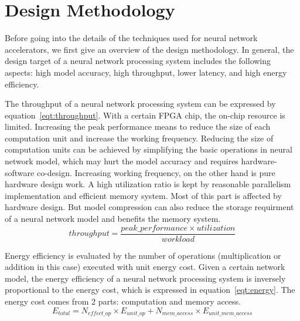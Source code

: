 \section{Design Methodology}\label{sec:design_method}

Before going into the details of the techniques used for neural network accelerators, we first give an overview of the design methodology. In general, the design target of a neural network processing system includes the following aspects: high model accuracy, high throughput, lower latency, and high energy efficiency.


The throughput of a neural network processing system can be expressed by equation~\ref{eqt:throughput}. With a certain FPGA chip, the on-chip resource is limited. Increasing the peak performance means to reduce the size of each computation unit and increase the working frequency. Reducing the size of computation units can be achieved by simplifying the basic operations in neural network model, which may hurt the model accuracy and requires hardware-software co-design. Increasing working frequency, on the other hand is pure hardware design work. A high utilization ratio is kept by reasonable parallelism implementation and efficient memory system. Most of this part is affected by hardware design. But model compression can also reduce the storage requirment of a neural network model and benefits the memory system.
\begin{equation}\label{eqt:throughput}
    throughput = \frac{peak\_performance \times utilization}{workload}
\end{equation}

Energy efficiency is evaluated by the number of operations (multiplication or addition in this case) executed with unit energy cost. Given a certain network model, the energy efficiency of a neural network processing system is inversely proportional to the energy cost, which is expressed in equation~\ref{eqt:energy}. The energy cost comes from 2 parts: computation and memory access. 
\begin{equation}\label{eqt:energy}
    E_{total} = N_{effect\_op}\times E_{unit\_op} + N_{mem\_access}\times E_{unit\_mem\_access}
\end{equation}

